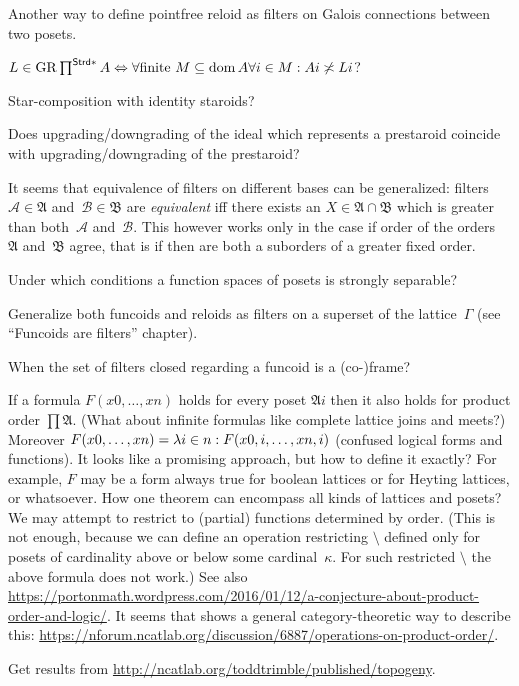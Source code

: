 \documentclass{amsart}
\begin{document}
Another way to define pointfree reloid as filters on Galois connections between two posets.

$L \in \operatorname{GR} \prod^{\mathsf{Strd} \ast} A \Leftrightarrow \forall
\text{finite } M \subseteq \operatorname{dom} A \forall i \in M : A i \not\asymp L i$?

Star-composition with identity staroids?

Does upgrading/downgrading of the ideal which represents a prestaroid coincide with upgrading/downgrading of the prestaroid?

It seems that equivalence of filters on different bases can be generalized:
filters~$\mathcal{A}\in\mathfrak{A}$ and~$\mathcal{B}\in\mathfrak{B}$ are \emph{equivalent} iff
there exists an $X\in\mathfrak{A}\cap\mathfrak{B}$ which is greater than both~$\mathcal{A}$ and~$\mathcal{B}$.
This however works only in the case if order of the orders~$\mathfrak{A}$ and~$\mathfrak{B}$ agree,
that is if then are both a suborders of a greater fixed order.

Under which conditions a function spaces of posets is strongly separable?

Generalize both funcoids and reloids as filters on a superset of the lattice~$\Gamma$ (see ``Funcoids are filters'' chapter).

When the set of filters closed regarding a funcoid is a (co-)frame?

If a formula $F(x 0,\dots,x n)$ holds for every poset $\mathfrak{A} i$ then it also holds for product order $\prod\mathfrak{A}$.
(What about infinite formulas like complete lattice joins and meets?)
Moreover $F(x 0,\dots,x n) = \lambda i\in n:F(x {0,i},\dots,x {n,i})$ (confused logical forms and functions).
It looks like a promising approach, but how to define it exactly? For example, $F$ may be a form always true for boolean
lattices or for Heyting lattices, or whatsoever. How one theorem can encompass all kinds of lattices and posets?
We may attempt to restrict to (partial) functions determined by order.
(This is not enough, because we can define an operation restricting $\setminus$ defined only for posets
of cardinality above or below some cardinal~$\kappa$. For such restricted $\setminus$ the above formula does not work.)
See also \url{https://portonmath.wordpress.com/2016/01/12/a-conjecture-about-product-order-and-logic/}.
It seems that  shows a general category-theoretic way to describe this:
\url{https://nforum.ncatlab.org/discussion/6887/operations-on-product-order/}.

Get results from \url{http://ncatlab.org/toddtrimble/published/topogeny}.
\end{document}
